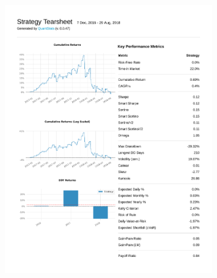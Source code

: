 \documentclass[12pt,a4paper]{article}
\begin{document}
\begin{figure}[ht!]
  \centering
  \begin{subfigure}[ht!]{0.45\textwidth}
    \includegraphics[width=\textwidth]{plots/qs_rppo.pdf}
  \end{subfigure}
  \hspace{0.05\textwidth}
  \begin{subfigure}[ht!]{0.45\textwidth}

\end{subfigure}
\end{figure}
\end{document}
